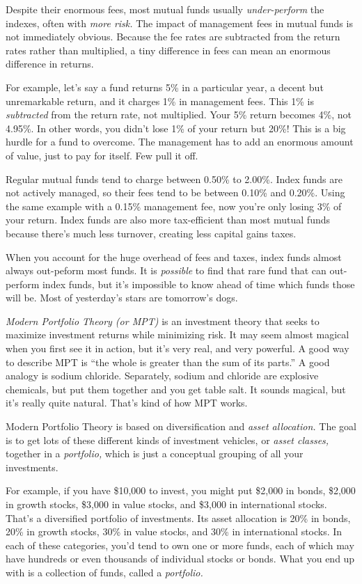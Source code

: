 Despite their enormous fees, most mutual funds usually \emph{under-perform} the indexes, often with \emph{more risk.} The impact of management fees in mutual funds is not immediately obvious. Because the fee rates are subtracted from the return rates rather than multiplied, a tiny difference in fees can mean an enormous difference in returns.

For example, let's say a fund returns 5\% in a particular year, a decent but unremarkable return, and it charges 1\% in management fees. This 1\% is \emph{subtracted} from the return rate, not multiplied. Your 5\% return becomes 4\%, not 4.95\%. In other words, you didn't lose 1\% of your return but 20\%! This is a big hurdle for a fund to overcome. The management has to add an enormous amount of value, just to pay for itself. Few pull it off.

Regular mutual funds tend to charge between 0.50\% to 2.00\%. Index funds are not actively managed, so their fees tend to be between 0.10\% and 0.20\%. Using the same example with a 0.15\% management fee, now you're only losing 3\% of your return. Index funds are also more tax-efficient than most mutual funds because there's much less turnover, creating less capital gains taxes.

When you account for the huge overhead of fees and taxes, index funds almost always out-peform most funds. It is \emph{possible} to find that rare fund that can out-perform index funds, but it's impossible to know ahead of time which funds those will be. Most of yesterday's stars are tomorrow's dogs.

\emph{Modern Portfolio Theory (or MPT)} is an investment theory that seeks to maximize investment returns while minimizing risk. It may seem almost magical when you first see it in action, but it's very real, and very powerful. A good way to describe MPT is ``the whole is greater than the sum of its parts.'' A good analogy is sodium chloride. Separately, sodium and chloride are explosive chemicals, but put them together and you get table salt. It sounds magical, but it's really quite natural. That's kind of how MPT works.

Modern Portfolio Theory is based on diversification and \emph{asset allocation.} The goal is to get lots of these different kinds of investment vehicles, or \emph{asset classes,} together in a \emph{portfolio,} which is just a conceptual grouping of all your investments.

For example, if you have \$10,000 to invest, you might put \$2,000 in bonds, \$2,000 in growth stocks, \$3,000 in value stocks, and \$3,000 in international stocks. That's a diversified portfolio of investments. Its asset allocation is 20\% in bonds, 20\% in growth stocks, 30\% in value stocks, and 30\% in international stocks. In each of these categories, you'd tend to own one or more funds, each of which may have hundreds or even thousands of individual stocks or bonds. What you end up with is a collection of funds, called a \emph{portfolio.}

